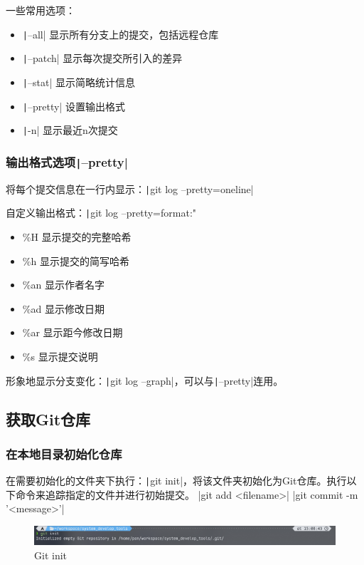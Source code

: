 \documentclass[fontset=ubuntu]{ctexart}
\begin{document}
一些常用选项：
\begin{itemize}
    \item \texttt|--all| 显示所有分支上的提交，包括远程仓库
    \item \texttt|--patch| 显示每次提交所引入的差异
    \item \texttt|--stat| 显示简略统计信息
    \item \texttt|--pretty| 设置输出格式
    \item \texttt|-n| 显示最近n次提交
\end{itemize}

\subsubsection{输出格式选项\texttt|--pretty|}
将每个提交信息在一行内显示：\texttt|git log --pretty=oneline|

自定义输出格式：\texttt|git log --pretty=format:"%
\begin{itemize}
    \item \%H 显示提交的完整哈希
    \item \%h 显示提交的简写哈希
    \item  \%an 显示作者名字
    \item  \%ad 显示修改日期 
    \item  \%ar 显示距今修改日期 
    \item  \%s 显示提交说明 
\end{itemize}

形象地显示分支变化：\texttt|git log --graph|，可以与\texttt|--pretty|连用。

\subsection{获取Git仓库}
\subsubsection{在本地目录初始化仓库}
在需要初始化的文件夹下执行：\texttt|git init|，将该文件夹初始化为Git仓库。执行以下命令来追踪指定的文件并进行初始提交。
|git add <filename>|
|git commit -m '<message>'|
\begin{figure}[htb]
    \centering
    \includegraphics[width=0.75\linewidth]{git_init_1.png}
    \caption{Git init}
    \label{fig:git_init_1}
\end{figure}
\end{document}
